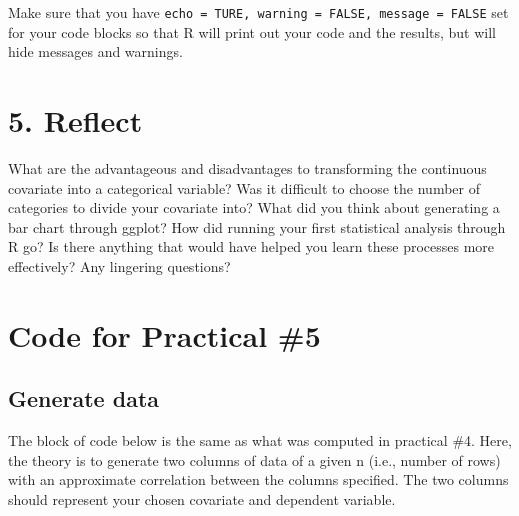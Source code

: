 \documentclass[
]{book}
\newenvironment{Shaded}{\begin{snugshade}}{\end{snugshade}}
\newcommand{\AttributeTok}[1]{\textcolor[rgb]{0.13,0.29,0.53}{#1}}
\newcommand{\CommentTok}[1]{\textcolor[rgb]{0.56,0.35,0.01}{\textit{#1}}}
\newcommand{\ConstantTok}[1]{\textcolor[rgb]{0.56,0.35,0.01}{#1}}
\newcommand{\FunctionTok}[1]{\textcolor[rgb]{0.13,0.29,0.53}{\textbf{#1}}}
\newcommand{\NormalTok}[1]{#1}
\newcommand{\SpecialCharTok}[1]{\textcolor[rgb]{0.81,0.36,0.00}{\textbf{#1}}}
\begin{document}
Make sure that you have \texttt{echo\ =\ TURE,\ warning\ =\ FALSE,\ message\ =\ FALSE} set for your code blocks so that R will print out your code and the results, but will hide messages and warnings.

\section*{5. Reflect}\label{reflect-4}

What are the advantageous and disadvantages to transforming the continuous covariate into a categorical variable? Was it difficult to choose the number of categories to divide your covariate into? What did you think about generating a bar chart through ggplot? How did running your first statistical analysis through R go? Is there anything that would have helped you learn these processes more effectively? Any lingering questions?

\section*{Code for Practical \#5}\label{code-for-practical-5}

\begin{Shaded}
\end{Shaded}

\subsection*{Generate data}\label{generate-data-1}

The block of code below is the same as what was computed in practical \#4. Here, the theory is to generate two columns of data of a given n (i.e., number of rows) with an approximate correlation between the columns specified. The two columns should represent your chosen covariate and dependent variable.
\end{document}
